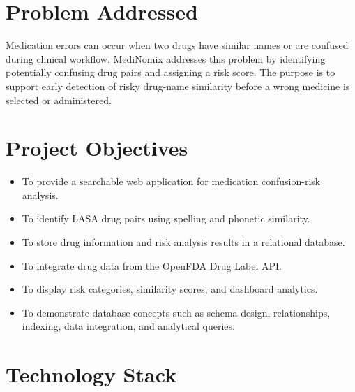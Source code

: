 \documentclass[12pt,a4paper]{article}
\begin{document}
\section{Problem Addressed}

Medication errors can occur when two drugs have similar names or are confused during clinical workflow. MediNomix addresses this problem by identifying potentially confusing drug pairs and assigning a risk score. The purpose is to support early detection of risky drug-name similarity before a wrong medicine is selected or administered.

\section{Project Objectives}

\begin{itemize}[leftmargin=1.4cm]
    \item To provide a searchable web application for medication confusion-risk analysis.
    \item To identify LASA drug pairs using spelling and phonetic similarity.
    \item To store drug information and risk analysis results in a relational database.
    \item To integrate drug data from the OpenFDA Drug Label API.
    \item To display risk categories, similarity scores, and dashboard analytics.
    \item To demonstrate database concepts such as schema design, relationships, indexing, data integration, and analytical queries.
\end{itemize}

\section{Technology Stack}
\end{document}
